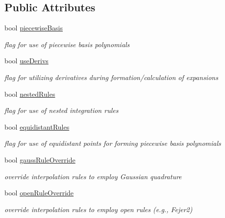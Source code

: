 \subsection*{Public Attributes}
\begin{DoxyCompactItemize}
\item 
bool \hyperlink{classPecos_1_1BasisConfigOptions_ae97d2f89ff8fe545aa9023279f71b5bc}{piecewise\+Basis}\label{classPecos_1_1BasisConfigOptions_ae97d2f89ff8fe545aa9023279f71b5bc}

\begin{DoxyCompactList}\small\item\em flag for use of piecewise basis polynomials \end{DoxyCompactList}\item 
bool \hyperlink{classPecos_1_1BasisConfigOptions_ad53c6bc00e92ff0e10ba3fd896c18a7d}{use\+Derivs}\label{classPecos_1_1BasisConfigOptions_ad53c6bc00e92ff0e10ba3fd896c18a7d}

\begin{DoxyCompactList}\small\item\em flag for utilizing derivatives during formation/calculation of expansions \end{DoxyCompactList}\item 
bool \hyperlink{classPecos_1_1BasisConfigOptions_aa53ad54ea1b8928e1a26ccd8505f59e9}{nested\+Rules}\label{classPecos_1_1BasisConfigOptions_aa53ad54ea1b8928e1a26ccd8505f59e9}

\begin{DoxyCompactList}\small\item\em flag for use of nested integration rules \end{DoxyCompactList}\item 
bool \hyperlink{classPecos_1_1BasisConfigOptions_ac594a3bb11101a1b117c756d84ebc14c}{equidistant\+Rules}\label{classPecos_1_1BasisConfigOptions_ac594a3bb11101a1b117c756d84ebc14c}

\begin{DoxyCompactList}\small\item\em flag for use of equidistant points for forming piecewise basis polynomials \end{DoxyCompactList}\item 
bool \hyperlink{classPecos_1_1BasisConfigOptions_abddb0ec628dbc665eb4b951b4cc473cc}{gauss\+Rule\+Override}\label{classPecos_1_1BasisConfigOptions_abddb0ec628dbc665eb4b951b4cc473cc}

\begin{DoxyCompactList}\small\item\em override interpolation rules to employ Gaussian quadrature \end{DoxyCompactList}\item 
bool \hyperlink{classPecos_1_1BasisConfigOptions_a534fdd21a453439193e1f1d6a372df46}{open\+Rule\+Override}\label{classPecos_1_1BasisConfigOptions_a534fdd21a453439193e1f1d6a372df46}

\begin{DoxyCompactList}\small\item\em override interpolation rules to employ open rules (e.\+g., Fejer2) \end{DoxyCompactList}\end{DoxyCompactItemize}


